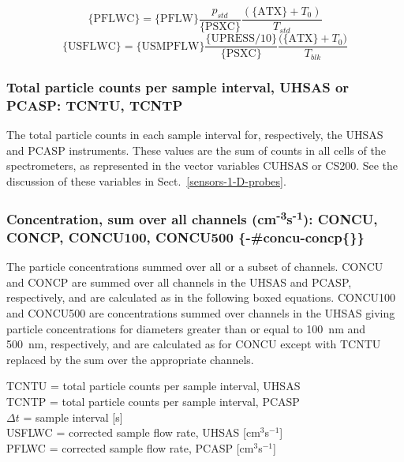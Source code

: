 \documentclass[
  english,
]{book}
\begin{document}
\begin{equation}
\mathrm{\{PFLWC\}}=\mathrm{\{PFLW\}}\frac{p_{std}}{\mathrm{\{PSXC\}}}\frac{(\mathrm{\{ATX\}}+T_{0})}{T_{std}}  
\label{eq:PFLWCbox1}
\end{equation}
\begin{equation}
\mathrm{\{USFLWC\}}=\mathrm{\{USMPFLW\}}\frac{\mathrm{\{UPRESS/10\}}}{\mathrm{\{PSXC\}}}\frac{\mathrm{(\{ATX\}}+T_{0})}{T_{blk}}  
\label{eq:PFLWCbox2}
\end{equation}

\hypertarget{tcntu-tcntp}{%
\subsubsection*{Total particle counts per sample interval, UHSAS or PCASP: TCNTU, TCNTP}\label{tcntu-tcntp}}

The total particle counts in each sample interval for, respectively, the UHSAS and PCASP instruments. These values are the sum of counts in all cells of the spectrometers, as represented in the vector variables CUHSAS or CS200. See the discussion of these variables in Sect.~\ref{sensors-1-D-probes}.

\hypertarget{concentration-sum-over-all-channels-cm-3s-1-concu-concp-concu100-concu500--concu-concp}{%
\subsubsection{\texorpdfstring{Concentration, sum over all channels (cm\textsuperscript{-3}s\textsuperscript{-1}): CONCU, CONCP, CONCU100, CONCU500 \{-\#concu-concp\{\}\}}{Concentration, sum over all channels (cm-3s-1): CONCU, CONCP, CONCU100, CONCU500 \{-\#concu-concp\{\}\}}}\label{concentration-sum-over-all-channels-cm-3s-1-concu-concp-concu100-concu500--concu-concp}}

The particle concentrations summed over all or a subset of channels. CONCU and CONCP are summed over all channels in the UHSAS and PCASP, respectively, and are calculated as in the following boxed equations. CONCU100 and CONCU500 are concentrations summed over channels in the UHSAS giving particle concentrations for diameters greater than or equal to 100~nm and 500~nm, respectively, and are calculated as for CONCU except with TCNTU replaced by the sum over the appropriate channels.

TCNTU = total particle counts per sample interval, UHSAS\\
TCNTP = total particle counts per sample interval, PCASP\\
\(\Delta t\) = sample
interval {[}s{]}\\
USFLWC = corrected sample flow rate, UHSAS {[}cm\(^{3}\)s\(^{-1}\){]}\\
PFLWC = corrected sample flow rate, PCASP {[}cm\(^{3}\)s\(^{-1}\){]}
\end{document}
